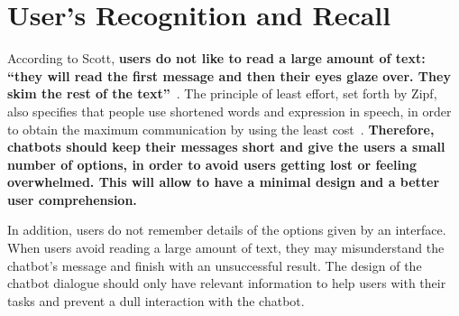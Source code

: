 \documentclass[a4paper,10pt]{article}
\begin{document}
\section{User's Recognition and Recall}

According to Scott, \textbf{users do not like to read a large amount of text: ``they will read the first message and then their eyes glaze over. They skim the rest of the text”}~\cite{HeuristicsWebPage}. The principle of least effort, set forth by Zipf, also specifies that people use shortened words and expression in speech, in order to obtain the maximum communication by using the least cost~\cite{zipf2016human}. \textbf{Therefore, chatbots should keep their messages short and give the users a small number of options, in order to avoid users getting lost or feeling overwhelmed. This will allow to have a minimal design and a better user comprehension.}

In addition, users do not remember details of the options given by an interface. When users avoid reading a large amount of text, they may misunderstand the chatbot’s message and finish with an unsuccessful result. The design of the chatbot dialogue should only have relevant information to help users with their tasks and prevent a dull interaction with the chatbot. 

\medskip


\end{document}
